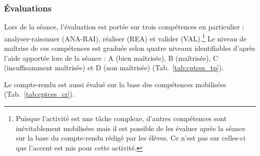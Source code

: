 \documentclass[12pt,a4paper]{article}
\newcommand{\rea}{\colorbox{yellow_c}{\textcolor{yellow_f}{REA}}}
\newcommand{\anarai}{\colorbox{green_c}{\textcolor{green_f}{ANA-RAI}}}
\newcommand{\val}{\colorbox{orange_c}{\textcolor{orange_f}{VAL}}}
\begin{document}
\subsubsection{Évaluations}

Lors de la séance, l'évaluation est portée sur trois compétences en particulier : analyser-raisonner (\anarai{}), réaliser (\rea{}) et valider (\val{}).\footnote{Puisque l'activité est une tâche complexe, d'autres compétences sont inévitablement mobilisées mais il est possible de les évaluer après la séance sur la base du compte-rendu rédigé par les élèves.
Ce n'est pas sur celles-ci que l'accent est mis pour cette activité.}
Le niveau de maîtrise de ces compétences est graduée selon quatre niveaux identifiables d'après l'aide apportée lors de la séance : A (bien maîtrisée), B (maîtrisée), C (insuffisamment maîtrisée) et D (non maîtrisée) (Tab.~\ref{tab:cptces_tp}).

Le compte-rendu est aussi évalué sur la base des compétences mobilisées (Tab.~\ref{tab:cptces_cr}).
\end{document}
